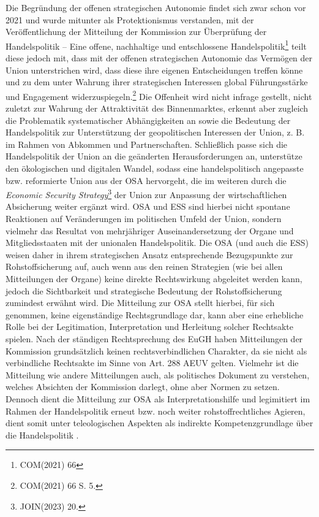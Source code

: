\documentclass[12pt,a4paper,oneside]{book} %
\begin{document}
Die Begründung der offenen strategischen Autonomie findet sich zwar schon vor 2021 und wurde mitunter als Protektionismus verstanden,\autocite{DGAP Policy Brief 8/2021} mit der Veröffentlichung der Mitteilung der Kommission zur \glqq Überprüfung der Handelspolitik -- Eine offene, nachhaltige und entschlossene Handelspolitik\grqq\footnote{COM(2021) 66} teilt diese jedoch mit, dass mit der offenen strategischen Autonomie das Vermögen der Union unterstrichen wird, dass diese ihre eigenen Entscheidungen treffen könne und zu dem unter Wahrung ihrer strategischen Interessen global Führungsstärke und Engagement widerzuspiegeln.\footnote{COM(2021) 66 S. 5.} Die Offenheit wird nicht infrage gestellt, nicht zuletzt zur Wahrung der Attraktivität des Binnenmarktes, erkennt aber zugleich die Problematik systematischer Abhängigkeiten an sowie die Bedeutung der Handelspolitik zur Unterstützung der geopolitischen Interessen der Union, z. B. im Rahmen von Abkommen und Partnerschaften. Schließlich passe sich die Handelspolitik der Union an die geänderten Herausforderungen an, unterstütze den ökologischen und digitalen Wandel, sodass eine handelspolitisch angepasste bzw. reformierte Union aus der OSA hervorgeht, die im weiteren durch die \textit{Economic Security Strategy}\footnote{JOIN(2023) 20.} der Union zur Anpassung der wirtschaftlichen Absicherung weiter ergänzt wird. OSA und ESS sind hierbei nicht spontane Reaktionen auf Veränderungen im politischen Umfeld der Union, sondern vielmehr das Resultat von mehrjähriger Auseinandersetzung der Organe und Mitgliedsstaaten mit der unionalen Handelspolitik.\autocite{Schmitz/Seidl JCMS 61 (2023), 834 (839 ff.);}
Die OSA (und auch die ESS) weisen daher in ihrem strategischen Ansatz entsprechende Bezugspunkte zur Rohstoffsicherung auf, auch wenn aus den reinen Strategien (wie bei allen Mitteilungen der Organe) keine direkte Rechtswirkung abgeleitet werden kann, jedoch die Sichtbarkeit und strategische Bedeutung der Rohstoffsicherung zumindest erwähnt wird.
Die Mitteilung zur OSA stellt hierbei, für sich genommen, keine eigenständige Rechtsgrundlage dar, kann aber eine erhebliche Rolle bei der Legitimation, Interpretation und Herleitung solcher Rechtsakte spielen. Nach der ständigen Rechtsprechung des EuGH haben Mitteilungen der Kommission grundsätzlich keinen rechtsverbindlichen Charakter, da sie nicht als verbindliche Rechtsakte im Sinne von Art. 288 AEUV gelten. Vielmehr ist die Mitteilung wie andere Mitteilungen auch, als politisches Dokument zu verstehen, welches Absichten der Kommission darlegt, ohne aber Normen zu setzen. Dennoch dient die Mitteilung zur OSA als Interpretationshilfe und legimitiert im Rahmen der Handelspolitik erneut bzw. noch weiter rohstoffrechtliches Agieren, dient somit unter teleologischen Aspekten als indirekte Kompetenzgrundlage über die Handelspolitik .
\end{document}
